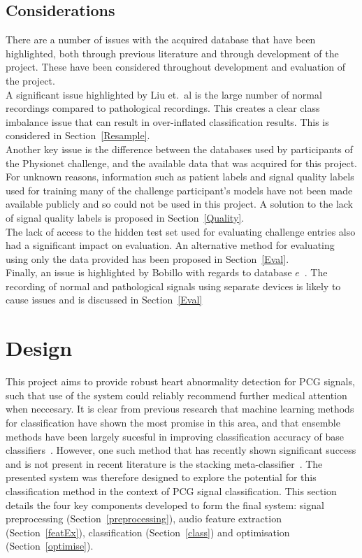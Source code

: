 \documentclass[titlepage, 12pt]{scrartcl} \usepackage{enumitem}
\begin{document}
\subsection{Considerations}\label{DBCons}
There are a number of issues with the acquired database that have been
highlighted, both through previous literature and through development of the
project. These have been considered throughout development and evaluation of
the project.\\
A significant issue highlighted by Liu et.\ al is the large number of normal
recordings compared to pathological recordings. This creates a clear class
imbalance issue that can result in over-inflated classification
results. This is considered in
Section~\ref{Resample}.\\
Another key issue is the difference between the databases used by participants of the
Physionet challenge, and the available data that was acquired for this project.
For unknown reasons, information such as patient labels and signal quality
labels used for training many of the challenge participant's
models have not been made available publicly and so could not be
used in this project. A solution to the lack of signal quality labels is
proposed in Section~\ref{Quality}.\\
The lack of access to the hidden test set used for evaluating challenge entries
also had a significant impact on evaluation. An alternative method for
evaluating using only the data provided has been proposed in
Section~\ref{Eval}.\\
Finally, an issue is highlighted by Bobillo with regards to database
$e$~\parencite{Bobillo2016}. The recording of normal and pathological signals using
separate devices is likely to cause issues and is discussed in
Section~\ref{Eval}

\section{Design}
This project aims to provide robust heart abnormality detection for PCG
signals, such that use of the system could reliably recommend further medical
attention when neccesary. It is clear from previous research that machine
learning methods for classification have shown the most promise in this area,
and that ensemble methods have been largely sucesful in improving
classification accuracy of base classifiers~\parencite{Homsi2017, Potes2016}.
However, one such method that has recently shown significant success and is not
present in recent literature is the stacking
meta-classifier~\parencite[p.498]{Tobergte2013a}. The presented system was
therefore designed to explore the potential for this classification method in
the context of PCG signal classification. This section details the four key
components developed to form the final system: signal preprocessing
(Section~\ref{preprocessing}), audio feature extraction (Section~\ref{featEx}),
classification (Section~\ref{class}) and optimisation (Section~\ref{optimise}).
\end{document}
